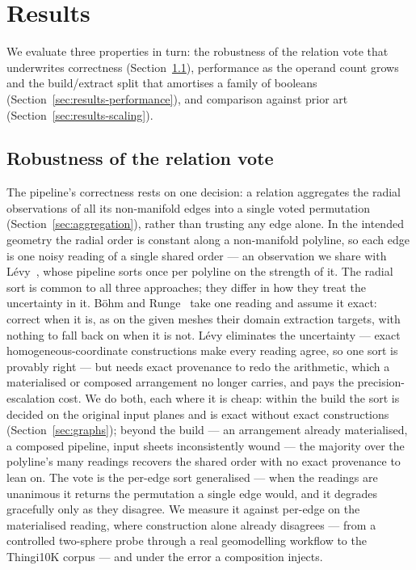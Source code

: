 \documentclass{egpubl}
\begin{document}
\section{Results}
\label{sec:results}

We evaluate three properties in turn: the robustness of the relation vote that underwrites correctness (Section~\ref{sec:results-robustness}), performance as the operand count grows and the build/extract split that amortises a family of booleans (Section~\ref{sec:results-performance}), and comparison against prior art (Section~\ref{sec:results-scaling}).

\subsection{Robustness of the relation vote}
\label{sec:results-robustness}

The pipeline's correctness rests on one decision: a relation aggregates the radial observations of all its non-manifold edges into a single voted permutation (Section~\ref{sec:aggregation}), rather than trusting any edge alone. In the intended geometry the radial order is constant along a non-manifold polyline, so each edge is one noisy reading of a single shared order --- an observation we share with L\'evy~\cite{Levy2025}, whose pipeline sorts once per polyline on the strength of it. The radial sort is common to all three approaches; they differ in how they treat the uncertainty in it. B\"ohm and Runge~\cite{BohmRunge2025} take one reading and assume it exact: correct when it is, as on the given meshes their domain extraction targets, with nothing to fall back on when it is not. L\'evy eliminates the uncertainty --- exact homogeneous-coordinate constructions make every reading agree, so one sort is provably right --- but needs exact provenance to redo the arithmetic, which a materialised or composed arrangement no longer carries, and pays the precision-escalation cost. We do both, each where it is cheap: within the build the sort is decided on the original input planes and is exact without exact constructions (Section~\ref{sec:graphs}); beyond the build --- an arrangement already materialised, a composed pipeline, input sheets inconsistently wound --- the majority over the polyline's many readings recovers the shared order with no exact provenance to lean on. The vote is the per-edge sort generalised --- when the readings are unanimous it returns the permutation a single edge would, and it degrades gracefully only as they disagree. We measure it against per-edge on the materialised reading, where construction alone already disagrees --- from a controlled two-sphere probe through a real geomodelling workflow to the Thingi10K corpus --- and under the error a composition injects.
\end{document}
